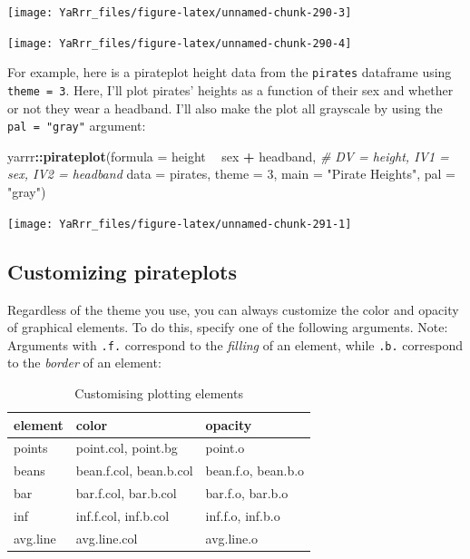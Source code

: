 \documentclass[]{book}
\newenvironment{Shaded}{\begin{snugshade}}{\end{snugshade}}
\newcommand{\KeywordTok}[1]{\textcolor[rgb]{0.13,0.29,0.53}{\textbf{#1}}}
\newcommand{\DataTypeTok}[1]{\textcolor[rgb]{0.13,0.29,0.53}{#1}}
\newcommand{\DecValTok}[1]{\textcolor[rgb]{0.00,0.00,0.81}{#1}}
\newcommand{\StringTok}[1]{\textcolor[rgb]{0.31,0.60,0.02}{#1}}
\newcommand{\CommentTok}[1]{\textcolor[rgb]{0.56,0.35,0.01}{\textit{#1}}}
\newcommand{\OperatorTok}[1]{\textcolor[rgb]{0.81,0.36,0.00}{\textbf{#1}}}
\newcommand{\NormalTok}[1]{#1}
\theoremstyle{definition}
\theoremstyle{definition}
\theoremstyle{remark}
\begin{document}
\begin{center}\texttt{[image: YaRrr\_files/figure-latex/unnamed-chunk-290-3]} \end{center}

\begin{center}\texttt{[image: YaRrr\_files/figure-latex/unnamed-chunk-290-4]} \end{center}

For example, here is a pirateplot height data from the \texttt{pirates}
dataframe using \texttt{theme\ =\ 3}. Here, I'll plot pirates' heights
as a function of their sex and whether or not they wear a headband. I'll
also make the plot all grayscale by using the \texttt{pal\ =\ "gray"}
argument:

\begin{Shaded}
\begin{Highlighting}[]
\NormalTok{yarrr}\OperatorTok{::}\KeywordTok{pirateplot}\NormalTok{(}\DataTypeTok{formula =}\NormalTok{ height }\OperatorTok{~}\StringTok{ }\NormalTok{sex }\OperatorTok{+}\StringTok{ }\NormalTok{headband,    }\CommentTok{# DV = height, IV1 = sex, IV2 = headband}
                  \DataTypeTok{data =}\NormalTok{ pirates,           }
                  \DataTypeTok{theme =} \DecValTok{3}\NormalTok{,}
                  \DataTypeTok{main =} \StringTok{"Pirate Heights"}\NormalTok{,}
                  \DataTypeTok{pal =} \StringTok{"gray"}\NormalTok{)}
\end{Highlighting}
\end{Shaded}

\begin{center}\texttt{[image: YaRrr\_files/figure-latex/unnamed-chunk-291-1]} \end{center}

\subsection{Customizing pirateplots}\label{customizing-pirateplots}

Regardless of the theme you use, you can always customize the color and
opacity of graphical elements. To do this, specify one of the following
arguments. Note: Arguments with \texttt{.f.} correspond to the
\emph{filling} of an element, while \texttt{.b.} correspond to the
\emph{border} of an element:

\begin{table}

\caption{\label{tab:unnamed-chunk-292}Customising plotting elements}
\centering
\begin{tabular}[t]{l|l|l}
\hline
element & color & opacity\\
\hline
points & point.col, point.bg & point.o\\
\hline
beans & bean.f.col, bean.b.col & bean.f.o, bean.b.o\\
\hline
bar & bar.f.col, bar.b.col & bar.f.o, bar.b.o\\
\hline
inf & inf.f.col, inf.b.col & inf.f.o, inf.b.o\\
\hline
avg.line & avg.line.col & avg.line.o\\
\hline
\end{tabular}
\end{table}
\end{document}
